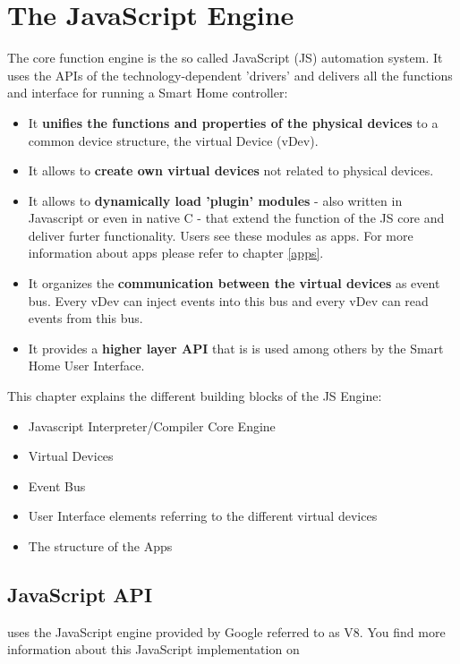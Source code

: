 \chapter{The JavaScript Engine}
\label{cap:js}


The \zway core function engine is the so called JavaScript (JS) automation system.
It uses the APIs of the technology-dependent 'drivers' and delivers all the functions
and interface for running a Smart Home controller:
\begin{itemize}
\item It \textbf{unifies the functions and properties of the physical devices} to a common 
device structure, the virtual Device (vDev).
\item It allows to \textbf{create own virtual devices} not related to physical devices.
\item It allows to \textbf{dynamically load 'plugin' modules}  - also written in Javascript or 
even in native C - that extend the function of the JS core and deliver furter functionality.
Users see these modules as apps. For more information about apps please refer to chapter 
\ref{apps}.
\item It organizes the \textbf{communication between the virtual devices} as event bus. Every 
vDev can inject events into this bus and every vDev can read events from this bus.
\item It provides a \textbf{higher layer API} that is 
is used among others by the Smart Home User Interface.
\end{itemize}

This chapter explains the different building blocks of the JS Engine:
\begin{itemize}
\item Javascript Interpreter/Compiler Core Engine
\item Virtual Devices
\item Event Bus
\item User Interface elements referring to the different virtual devices
\item The structure of the Apps
\end{itemize}

\section{JavaScript API}

\zway uses the JavaScript engine provided by Google referred to as V8. You find more 
information about this JavaScript implementation on 

